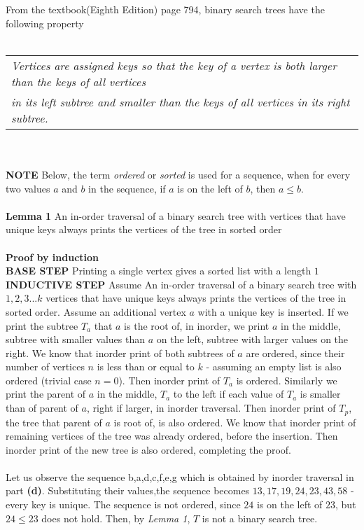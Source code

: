 \documentclass[11pt]{article}
\begin{document}
From the textbook(Eighth Edition) page 794, binary search trees have the following property
\\ \\
\begin{tabular}{l}
    \textit{Vertices are assigned keys so that the key of a vertex is both larger than the keys of all vertices}\\
    \textit{in its left subtree and smaller than the keys of all vertices in its right subtree.}
\end{tabular}
\\ \\
\textbf{NOTE} Below, the term \textit{ordered} or \textit{sorted} is used for a sequence, when 
for every two values $a$ and $b$ in the sequence, if $a$ is on the left of $b$, then $a \leq b$.
\\ \\
\textbf{Lemma 1} An in-order traversal of a binary search tree with vertices that have unique keys
always prints the vertices of the tree in sorted order
\\ \\
\textbf{Proof by induction}\\ 
\textbf{BASE STEP} Printing a single vertex gives a sorted list with a length $1$\\
\textbf{INDUCTIVE STEP} Assume An in-order traversal of a binary search tree with 
$1,2,3...k$ vertices that have unique keys always prints the vertices of the tree in sorted order. 
Assume an additional vertex $a$ with a unique key is inserted. If we print the subtree $T_a$ that
$a$ is the root of, in inorder, we print $a$ in the middle, subtree with smaller values than 
$a$ on the left, subtree with larger values on the right. We know that inorder print of both 
subtrees of $a$ are ordered, since their number of vertices $n$ is less than or equal to $k$
- assuming an empty list is also ordered (trivial case $n=0$). Then 
inorder print of $T_a$ is ordered. Similarly we print the parent of $a$ in the middle, 
$T_a$ to the left if each value of $T_a$ is smaller than of parent of $a$, right if larger, 
in inorder traversal. 
Then inorder print of $T_p$, the tree that parent of $a$ is root of, is also ordered. 
We know that inorder print of remaining vertices of the tree 
was already ordered, before the insertion. Then inorder print of the new tree is also ordered, 
completing the proof.
\\ \\
Let us observe the sequence b,a,d,c,f,e,g which is obtained by inorder traversal in part \textbf{(d)}.
Substituting their values,the sequence becomes $13,17,19,24,23,43,58$ -every key is unique. The sequence is not ordered, since
$24$ is on the left of $23$, but $24 \leq 23$ does not hold. Then, by \textit{Lemma 1}, $T$ is not a binary search tree.
\end{document}
